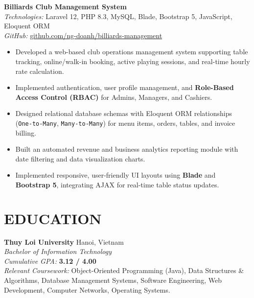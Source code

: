 ﻿\documentclass[10pt,a4paper]{article}
\begin{document}
\vspace{3pt}

\noindent
\textbf{Billiards Club Management System} \hfill {} \\
\textit{Technologies:} Laravel 12, PHP 8.3, MySQL, Blade, Bootstrap 5, JavaScript, Eloquent ORM \\
\textit{GitHub:} \href{https://github.com/ng-doanh/billiards-management}{github.com/ng-doanh/billiards-management}
\begin{itemize}
    \item Developed a web-based club operations management system supporting table tracking, online/walk-in booking, active playing sessions, and real-time hourly rate calculation.
    \item Implemented authentication, user profile management, and \textbf{Role-Based Access Control (RBAC)} for Admins, Managers, and Cashiers.
    \item Designed relational database schemas with Eloquent ORM relationships (\texttt{One-to-Many}, \texttt{Many-to-Many}) for menu items, orders, tables, and invoice billing.
    \item Built an automated revenue and business analytics reporting module with date filtering and data visualization charts.
    \item Implemented responsive, user-friendly UI layouts using \textbf{Blade} and \textbf{Bootstrap 5}, integrating AJAX for real-time table status updates.
\end{itemize}

\section*{EDUCATION}
\noindent
\textbf{Thuy Loi University} \hfill Hanoi, Vietnam \\
\textit{Bachelor of Information Technology} \hfill {} \\
\textit{Cumulative GPA:} \textbf{3.12 / 4.00} \\
\textit{Relevant Coursework:} Object-Oriented Programming (Java), Data Structures \& Algorithms, Database Management Systems, Software Engineering, Web Development, Computer Networks, Operating Systems.

\end{document}
